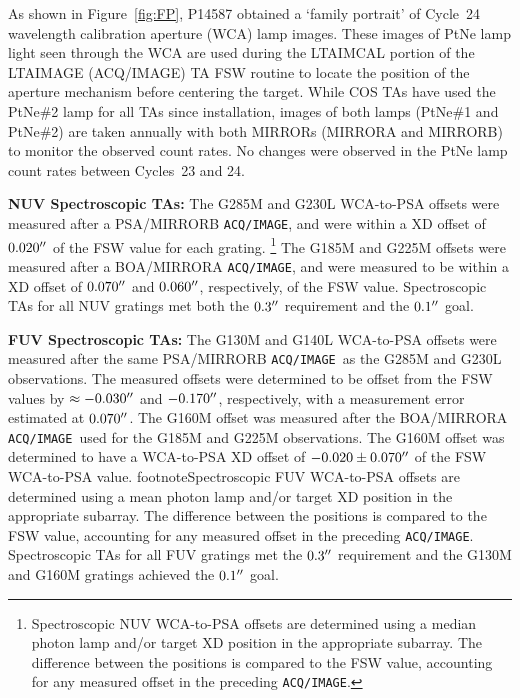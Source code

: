 \begin{description}
	As shown in Figure~\ref{fig:FP}, P14587 obtained a `family portrait' of Cycle~24 wavelength calibration aperture (WCA) lamp images. These images of PtNe lamp light seen through the WCA
	are used during the LTAIMCAL portion of the LTAIMAGE (ACQ/IMAGE) TA FSW routine to locate the position of the aperture mechanism before centering the target.
	While COS TAs have used the PtNe\#2 lamp for all TAs since installation, images of both lamps (PtNe\#1 and PtNe\#2) are taken annually with both MIRRORs
	(MIRRORA and MIRRORB) to monitor the observed count rates. No changes were observed in the PtNe lamp count rates between Cycles~23 and 24.
	\clearpage
\item{\bf NUV Spectroscopic TAs:}
	The G285M and G230L WCA-to-PSA offsets were measured after a PSA/MIRRORB \texttt{ACQ/IMAGE}, and were within a XD offset of $0.020\hbox{$^{\prime\prime}$}$ of the FSW value for each grating.
	\footnote{Spectroscopic NUV WCA-to-PSA offsets are determined using a median photon lamp and/or target XD position in the appropriate subarray. The difference between the positions is compared to the FSW value, accounting for any measured offset in the preceding \texttt{ACQ/IMAGE}.}
	The G185M and G225M offsets were measured after a BOA/MIRRORA \texttt{ACQ/IMAGE}, and were measured to be within a XD offset of $0.070\hbox{$^{\prime\prime}$}$ and $0.060\hbox{$^{\prime\prime}$}$, respectively, of the FSW value.
	Spectroscopic TAs for all NUV gratings met both the $0.3\hbox{$^{\prime\prime}$}$ requirement and the $0.1\hbox{$^{\prime\prime}$}$ goal.
\item{\bf FUV Spectroscopic TAs:}
	The G130M and G140L WCA-to-PSA offsets were measured after the same PSA/MIRRORB \texttt{ACQ/IMAGE}~as the G285M and G230L observations.
	The measured offsets were determined to be offset from the FSW values by $\approx -0.030\hbox{$^{\prime\prime}$}$ and $-0.170\hbox{$^{\prime\prime}$}$, respectively, with a measurement error estimated at $0.070\hbox{$^{\prime\prime}$}$.
	The G160M offset was measured after the BOA/MIRRORA \texttt{ACQ/IMAGE}~used for the G185M and G225M observations. The G160M offset was determined to have a WCA-to-PSA XD offset of $-0.020 \pm 0.070\hbox{$^{\prime\prime}$}$ of the FSW WCA-to-PSA value.
footnote{Spectroscopic FUV WCA-to-PSA offsets are determined using a mean photon lamp and/or target XD position in the appropriate subarray. The difference between the positions is compared to the FSW value, accounting for any measured offset in the preceding \texttt{ACQ/IMAGE}.}
	Spectroscopic TAs for all FUV gratings met the $0.3\hbox{$^{\prime\prime}$}$ requirement and the G130M and G160M gratings achieved the $0.1\hbox{$^{\prime\prime}$}$ goal.

\end{description}
